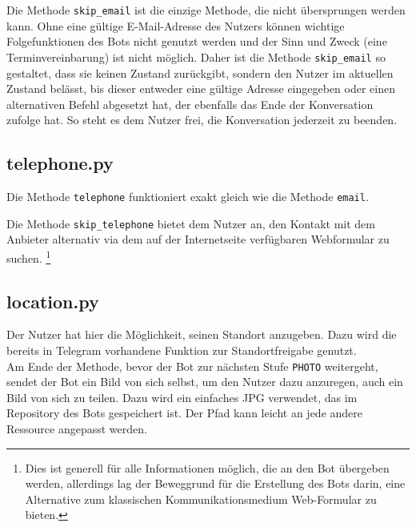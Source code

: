                 Die Methode \verb|skip_email| ist die einzige Methode, die nicht übersprungen werden kann. Ohne eine gültige E-Mail-Adresse des Nutzers können wichtige Folgefunktionen des Bots nicht genutzt werden und der Sinn und Zweck (eine Terminvereinbarung) ist nicht möglich. Daher ist die Methode \verb|skip_email| so gestaltet, dass sie keinen Zustand zurückgibt, sondern den Nutzer im aktuellen Zustand belässt, bis dieser entweder eine gültige Adresse eingegeben oder einen alternativen Befehl abgesetzt hat, der ebenfalls das Ende der Konversation zufolge hat. So steht es dem Nutzer frei, die Konversation jederzeit zu beenden. 
        
            
        \subsection{telephone.py} \label{telephone.py}
                Die Methode \verb|telephone| funktioniert exakt gleich wie die Methode \verb|email|.

                Die Methode \verb|skip_telephone| bietet dem Nutzer an, den Kontakt mit dem Anbieter alternativ via dem auf der Internetseite verfügbaren Webformular zu suchen. \footnote{Dies ist generell für alle Informationen möglich, die an den Bot übergeben werden, allerdings lag der Beweggrund für die Erstellung des Bots darin, eine Alternative zum klassischen Kommunikationsmedium Web-Formular zu bieten.}
        
        
        \subsection{location.py} \label{location.py}
                Der Nutzer hat hier die Möglichkeit, seinen Standort anzugeben. Dazu wird die bereits in Telegram vorhandene Funktion zur Standortfreigabe genutzt. \\
                Am Ende der Methode, bevor der Bot zur nächsten Stufe \verb|PHOTO| weitergeht, sendet der Bot ein Bild von sich selbst, um den Nutzer dazu anzuregen, auch ein Bild von sich zu teilen. Dazu wird ein einfaches JPG verwendet, das im Repository des Bots gespeichert ist. Der Pfad kann leicht an jede andere Ressource angepasst werden.


